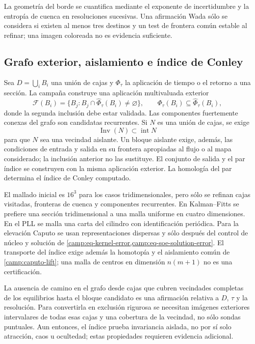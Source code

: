 La geometría del borde se cuantifica mediante el exponente de incertidumbre
y la entropía de cuenca en resoluciones sucesivas. Una afirmación Wada sólo se
considera si existen al menos tres destinos y un test de frontera común
estable al refinar; una imagen coloreada no es evidencia suficiente.
\fi

\subsection{Grafo exterior, aislamiento e índice de Conley}
\label{camp:set-oriented}

Sea \(D=\bigcup_i B_i\) una unión de cajas y \(\Phi_\tau\) la aplicación de
tiempo o el retorno a una sección. La campaña construye una aplicación
multivaluada exterior
\begin{equation}
 \mathcal F(B_i)=
 \{B_j:B_j\cap\widehat\Phi_\tau(B_i)\neq\varnothing\},
 \qquad
 \Phi_\tau(B_i)\subseteq\widehat\Phi_\tau(B_i),
 \label{camp:eq-outer-map}
\end{equation}
donde la segunda inclusión debe estar validada. Las componentes fuertemente
conexas del grafo son candidatas recurrentes. Si \(N\) es una unión de cajas,
se exige
\begin{equation}
 \operatorname{Inv}(N)\subset\operatorname{int}N
 \label{camp:eq-isolating-block}
\end{equation}
para que \(N\) sea una vecindad aislante. Un bloque aislante exige,
además, las condiciones de entrada y salida en su frontera apropiadas al
flujo o al mapa considerado; la inclusión anterior no las sustituye.
El conjunto de salida y el par índice se construyen con la misma aplicación
exterior. La homología del par determina el índice de Conley computado.

El mallado inicial es \(16^3\) para los casos tridimensionales, pero sólo se
refinan cajas visitadas, fronteras de cuenca y componentes recurrentes. En
Kalman--Fitts se prefiere una sección tridimensional a una malla uniforme en
cuatro dimensiones. En el PLL se malla una carta del cilindro con
identificación periódica. Para la elevación Caputo se usan representaciones
dispersas y sólo después del control de núcleo y solución de
\cref{camp:eq-kernel-error,camp:eq-soe-solution-error}. El transporte del índice
exige además la homotopía y el aislamiento común de \cref{camp:caputo-lift};
una malla de centros en dimensión \(n(m+1)\) no es una certificación.

La ausencia de camino en el grafo desde cajas que cubren vecindades completas
de los equilibrios hasta el bloque candidato es una afirmación relativa a
\(D\), \(\tau\) y la resolución. Para convertirla en exclusión rigurosa se
necesitan imágenes exteriores intervalares de todas esas cajas y una cobertura
de la vecindad, no sólo sondas puntuales. Aun entonces, el índice prueba
invariancia aislada, no por sí solo atracción, caos u ocultedad; estas
propiedades requieren evidencia adicional.


